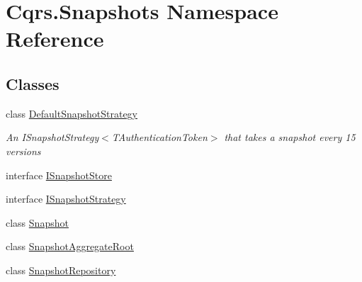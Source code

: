 \hypertarget{namespaceCqrs_1_1Snapshots}{}\section{Cqrs.\+Snapshots Namespace Reference}
\label{namespaceCqrs_1_1Snapshots}
\subsection*{Classes}
\begin{DoxyCompactItemize}
\item 
class \hyperlink{classCqrs_1_1Snapshots_1_1DefaultSnapshotStrategy}{Default\+Snapshot\+Strategy}
\begin{DoxyCompactList}\small\item\em An I\+Snapshot\+Strategy$<$\+T\+Authentication\+Token$>$ that takes a snapshot every 15 versions \end{DoxyCompactList}\item 
interface \hyperlink{interfaceCqrs_1_1Snapshots_1_1ISnapshotStore}{I\+Snapshot\+Store}
\item 
interface \hyperlink{interfaceCqrs_1_1Snapshots_1_1ISnapshotStrategy}{I\+Snapshot\+Strategy}
\item 
class \hyperlink{classCqrs_1_1Snapshots_1_1Snapshot}{Snapshot}
\item 
class \hyperlink{classCqrs_1_1Snapshots_1_1SnapshotAggregateRoot}{Snapshot\+Aggregate\+Root}
\item 
class \hyperlink{classCqrs_1_1Snapshots_1_1SnapshotRepository}{Snapshot\+Repository}
\end{DoxyCompactItemize}
